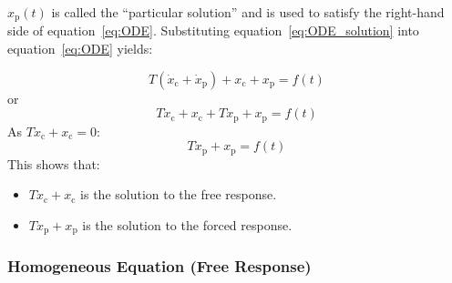 \documentclass[12pt,letter]{article}
\numberwithin{ex}{section} %
\numberwithin{re}{section} %
\numberwithin{equation}{section}	%
\begin{document}
$x_\text{p}(t)$  is called the ``particular solution'' and is used to satisfy the right-hand side of equation~\ref{eq:ODE}. Substituting equation~\ref{eq:ODE_solution} into equation~\ref{eq:ODE} yields:

\begin{equation}
T(\dot{x}_\text{c} + \dot{x}_\text{p}) + x_\text{c}+x_\text{p} = f(t)
\end{equation}
or
\begin{equation}
T\dot{x}_\text{c} + x_\text{c} + T \dot{x}_\text{p} + x_\text{p} = f(t)
\end{equation}
As $T\dot{x}_\text{c} + x_\text{c}=0$:
\begin{equation}
T \dot{x}_\text{p} + x_\text{p} = f(t)
\end{equation}
This shows that:
\begin{itemize}
\item $T\dot{x}_\text{c} + x_\text{c}$ is the solution to the free response.
\item $T \dot{x}_\text{p} + x_\text{p}$ is the solution to the forced response.
\end{itemize}

\subsubsection{Homogeneous Equation (Free Response)}
\end{document}
